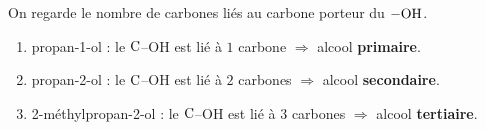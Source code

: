 \documentclass[11pt,a4paper]{article}
\begin{document}
\begin{corrige}
On regarde le nombre de carbones liés au carbone porteur du $-\ce{OH}$.
\begin{enumerate}[label=\alph*)]
  \item propan-1-ol : le $\ce{C}$--OH est lié à $1$ carbone $\Rightarrow$ alcool \textbf{primaire}.
  \item propan-2-ol : le $\ce{C}$--OH est lié à $2$ carbones $\Rightarrow$ alcool \textbf{secondaire}.
  \item 2-méthylpropan-2-ol : le $\ce{C}$--OH est lié à $3$ carbones $\Rightarrow$ alcool \textbf{tertiaire}.
\end{enumerate}
\end{corrige}
\end{document}
